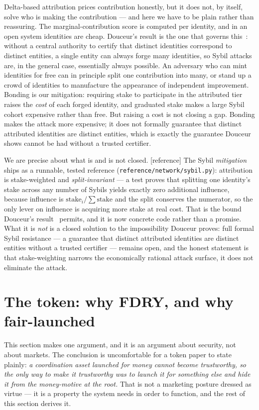 \documentclass[11pt]{article}
\newcommand{\refimpl}{\textcolor{blue!70!black}{\small[reference]}}
\begin{document}
Delta-based attribution prices contribution honestly, but it does not, by itself,
solve who is making the contribution --- and here we have to be plain rather than
reassuring. The marginal-contribution score is computed per identity, and in an
open system identities are cheap. Douceur's result is the one that governs
this~\cite{sybil}: without a central authority to certify that distinct identities
correspond to distinct entities, a single entity can always forge many identities,
so Sybil attacks are, in the general case, essentially always possible. An adversary
who can mint identities for free can in principle split one contribution into many,
or stand up a crowd of identities to manufacture the appearance of independent
improvement. Bonding is our mitigation: requiring stake to participate in the
attributed tier raises the \emph{cost} of each forged identity, and graduated stake
makes a large Sybil cohort expensive rather than free. But raising a cost is not
closing a gap. Bonding makes the attack more expensive; it does not formally
guarantee that distinct attributed identities are distinct entities, which is
exactly the guarantee Douceur shows cannot be had without a trusted certifier.

We are precise about what is and is not closed. \refimpl{} The Sybil
\emph{mitigation} ships as a runnable, tested reference
(\texttt{reference/network/sybil.py}): attribution is stake-weighted and
\emph{split-invariant} --- a test proves that splitting one identity's stake across
any number of Sybils yields exactly zero additional influence, because influence is
$\text{stake}_i/\sum\text{stake}$ and the split conserves the numerator, so the only
lever on influence is acquiring more stake at real cost. That is the bound Douceur's
result~\cite{sybil} permits, and it is now concrete code rather than a promise. What
it is \emph{not} is a closed solution to the impossibility Douceur proves: full
formal Sybil resistance --- a guarantee that distinct attributed identities are
distinct entities without a trusted certifier --- remains open, and the honest
statement is that stake-weighting narrows the economically rational attack surface,
it does not eliminate the attack.

\section{The token: why FDRY, and why fair-launched}

This section makes one argument, and it is an argument about security, not about
markets. The conclusion is uncomfortable for a token paper to state plainly:
\emph{a coordination asset launched for money cannot become trustworthy, so the
only way to make it trustworthy was to launch it for something else and hide it
from the money-motive at the root.} That is not a marketing posture dressed as
virtue --- it is a property the system needs in order to function, and the rest of
this section derives it.
\end{document}

